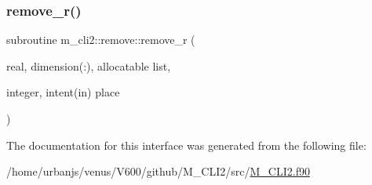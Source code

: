 \mbox{\label{interfacem__cli2_1_1remove_a13995f1150dcabb9127cfeb30a629406}} 
\subsubsection{\texorpdfstring{remove\+\_\+r()}{remove\_r()}}
{\footnotesize\ttfamily subroutine m\+\_\+cli2\+::remove\+::remove\+\_\+r (\begin{DoxyParamCaption}\item[{real, dimension(\+:), allocatable}]{list,  }\item[{integer, intent(in)}]{place }\end{DoxyParamCaption})\hspace{0.3cm}{\ttfamily [private]}}



The documentation for this interface was generated from the following file\+:\begin{DoxyCompactItemize}
\item 
/home/urbanjs/venus/\+V600/github/\+M\+\_\+\+C\+L\+I2/src/\mbox{\hyperlink{M__CLI2_8f90}{M\+\_\+\+C\+L\+I2.\+f90}}\end{DoxyCompactItemize}
